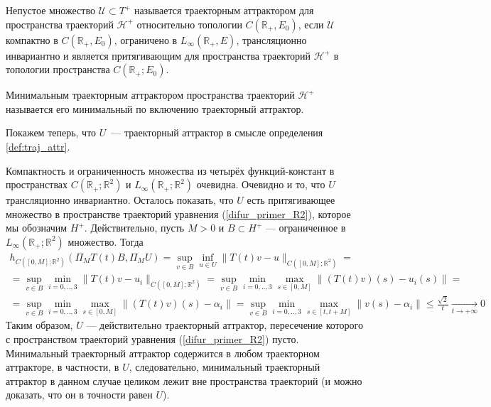 \begin{definition}\label{def:traj_attr}
	Непустое множество $\mathcal{U}\subset T^+$
	называется траекторным аттрактором для пространства траекторий $\mathcal{H}^+$
	относительно топологии $C(\mathbb{R}_+,E_0)$, если
			$\mathcal{U}$ компактно в $C(\mathbb{R}_+,E_0)$,
			ограничено в $L_{\infty}(\mathbb{R}_+,E)$,
			трансляционно инвариантно
			и является притягивающим для пространства траекторий $\mathcal{H}^+$
			в топологии пространства $C(\mathbb{R}_+; E_0)$.
\end{definition}

\begin{definition}
	Минимальным траекторным аттрактором пространства траекторий $\mathcal{H}^+$
	называется его минимальный по включению траекторный аттрактор.
\end{definition}

Покажем теперь, что $U$~--- траекторный аттрактор в смысле определения \ref{def:traj_attr}.


Компактность и ограниченность множества из четырёх функций-констант в пространствах
$C(\mathbb{R}_+; \mathbb{R}^2)$ и $L_\infty(\mathbb{R}_+; \mathbb{R}^2)$ очевидна.
Очевидно и то, что $U$ трансляционно инвариантно.
%
Осталось показать, что $U$ есть притягивающее множество в пространстве траекторий уравнения (\ref{difur_primer_R2}),
которое мы обозначим $H^+$.
Действительно, пусть $M>0$ и $B\subset H^+$ --- ограниченное в $L_\infty(\mathbb{R}_+; \mathbb{R}^2)$ множество.
Тогда
\begin{multline*}
	h_{C([0,M];\mathbb{R}^2)}(\Pi_M T(t)B,\Pi_M U) =
	\sup_{v\in B} \inf_{u\in U} \| T(t) v - u \|_{C([0,M];\mathbb{R}^2)} =
	\\ =
	\sup_{v\in B} \min_{i=0,..,3} \| T(t) v - u_i \|_{C([0,M];\mathbb{R}^2)} =
	\sup_{v\in B} \min_{i=0,..,3} \max_{s\in[0,M]} \| (T(t) v)(s) - u_i(s) \| =
	\\ =
	\sup_{v\in B} \min_{i=0,..,3} \max_{s\in[0,M]} \| (T(t) v)(s) - \alpha_i \| =
	\sup_{v\in B} \min_{i=0,..,3} \max_{s\in[t,t+M]} \| v(s) - \alpha_i \| \leq
	\frac{\sqrt{2}}{t} \xrightarrow[t\to + \infty]{} 0
\end{multline*}
Таким образом, $U$ --- действительно траекторный аттрактор, пересечение которого с пространством траекторий
уравнения (\ref{difur_primer_R2}) пусто.
Минимальный траекторный аттрактор содержится в любом траекторном аттракторе, в частности, в $U$,
следовательно, минимальный траекторный аттрактор в данном случае целиком лежит вне пространства траекторий
(и можно доказать, что он в точности равен $U$).

